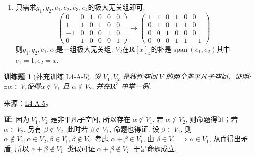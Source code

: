 \documentclass[12pt,fontset=fandol]{ctexart}
\newtheorem{exercise}{训练题}[section]
\begin{document}
\begin{solve}
\begin{enumerate}
                \item 只需求$g_1,g_2,e_1,e_2,e_3,e_4$的极大无关组即可.
                      \[\begin{pmatrix}
                              0  & 0 & 1 & 0 & 0 & 0 \\
                              1  & 1 & 0 & 1 & 0 & 0 \\
                              -1 & 0 & 0 & 0 & 1 & 0 \\
                              0  & 1 & 0 & 0 & 0 & 1\end{pmatrix}\rightarrow
                          \begin{pmatrix}
                              1 & 1 & 0 & 1 & 0 & 0  \\
                              0 & 1 & 0 & 1 & 1 & 0  \\
                              0 & 0 & 1 & 0 & 0 & 0  \\
                              0 & 0 & 0 & 1 & 1 & -1\end{pmatrix}\]
                      则$g_1,g_2,e_1,e_2$是一组极大无关组. $V_2$在$\mathbf{R}[x]_4$的补是$\operatorname{span}(e_1,e_2)$其中$e_1=1,e_2=x$.
            \end{enumerate}
\end{solve}

\begin{exercise}[补充训练 L4-A-5]\label{prob:L4-A-5}
设 $V_1,V_2$ 是线性空间 $V$ 的两个非平凡子空间，证明: $\exists \alpha \in V$,使得$\alpha \notin V_1$ 且 $\alpha \notin V_2$. 并在$\mathbf{R}^3$ 中举一例.
\end{exercise}
\noindent 来源：\href{https://github.com/yhwu-is/Linear-Algebra-Left-Undone/blob/new/%E8%AE%B2%E4%B9%89/%E4%B8%93%E9%A2%98/4%20%E7%BA%BF%E6%80%A7%E7%A9%BA%E9%97%B4%E7%9A%84%E8%BF%90%E7%AE%97.tex}{L4-A-5}。
\begin{solve}
\textbf{证:} 因为 $V_1, V_2$ 是非平凡子空间, 所以存在 $\alpha \notin V_1$. 若 $\alpha \notin V_2$, 则命题得证；若 $\alpha \in V_2$, 另有 $\beta \notin V_2$, 此时若 $\beta \notin V_1$, 命题也得证. 设 $\beta \in V_1$, 则 $\alpha \notin V_1, \alpha \in V_2, \beta \in V_1, \beta \notin V_2$.
            考虑 $\alpha + \beta \in V_1$, 由 $\beta \in V_1 \implies \alpha \in V_1$, 从而得出矛盾, 所以 $\alpha + \beta \notin V_1$. 类似可证 $\alpha + \beta \notin V_2$. 于是命题成立.
\end{solve}
\end{document}
